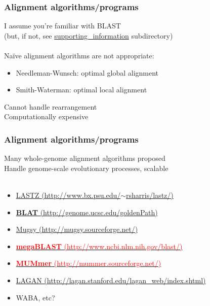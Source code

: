 %
\begin{frame}
  \frametitle{Alignment algorithms/programs}
  \textcolor{hutton_green}{I assume you're familiar with BLAST} \\
  (but, if not, see \url{supporting_information} subdirectory) \\~\\
  \textcolor{RawSienna}{Na\"{i}ve alignment algorithms are not appropriate}:
  \begin{itemize}
    \item Needleman-Wunsch: optimal global alignment
    \item Smith-Waterman: optimal local alignment
  \end{itemize}
  \textcolor{hutton_blue}{Cannot handle rearrangement} \\
  \textcolor{hutton_purple}{Computationally expensive}  
\end{frame}

%
\begin{frame}
  \frametitle{Alignment algorithms/programs}
  \textcolor{hutton_green}{Many whole-genome alignment algorithms proposed} \\
  Handle genome-scale evolutionary processes, scalable \\~\\
  \begin{itemize}
    \item \href{http://www.bx.psu.edu/~rsharris/lastz/}{LASTZ (http://www.bx.psu.edu/$\sim$rsharris/lastz/)}
    \item \href{http://genome.ucsc.edu/goldenPath/help/blatSpec.html}{\textcolor{hutton_blue}{\textbf{BLAT} (http://genome.ucsc.edu/goldenPath)}}
    \item \href{http://mugsy.sourceforge.net/}{Mugsy (http://mugsy.sourceforge.net/)}
    \item \href{http://www.ncbi.nlm.nih.gov/blast/html/megablast.html}{\textcolor{red}{\textbf{megaBLAST} (http://www.ncbi.nlm.nih.gov/blast/)}}
    \item \href{http://mummer.sourceforge.net/}{\textcolor{red}{\textbf{MUMmer} (http://mummer.sourceforge.net/)}}
    \item \href{http://lagan.stanford.edu/lagan_web/index.shtml}{{\textcolor{hutton_blue}{LAGAN (http://lagan.stanford.edu/lagan\_web/index.shtml)}}}
    \item WABA, etc?
  \end{itemize}
\end{frame}

